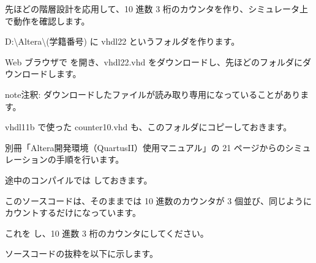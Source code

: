 \documentclass[letterpaper,10pt,dvipdfmx]{sphinxmanual}
\begin{document}
先ほどの階層設計を応用して、10 進数 3 桁のカウンタを作り、シミュレータ上で動作を確認します。

D:\textbackslash{}Altera\textbackslash{}(学籍番号) に vhdl22 というフォルダを作ります。

Web ブラウザで  を開き、vhdl22.vhd をダウンロードし、先ほどのフォルダにダウンロードします。

\begin{sphinxadmonition}{note}{注釈:}
ダウンロードしたファイルが読み取り専用になっていることがあります。
\end{sphinxadmonition}

vhdl11b で使った counter10.vhd も、このフォルダにコピーしておきます。

別冊「Altera開発環境（QuartusII）使用マニュアル」の 21 ページからのシミュレーションの手順を行います。

途中のコンパイルでは  しておきます。

このソースコードは、そのままでは 10 進数のカウンタが 3 個並び、同じようにカウントするだけになっています。

これを  し、10 進数 3 桁のカウンタにしてください。

ソースコードの抜粋を以下に示します。
\end{document}
